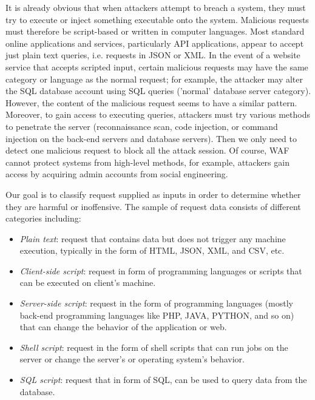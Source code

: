 It is already obvious that when attackers attempt to breach a system, they must try to execute or inject something executable onto the system. Malicious requests must therefore be script-based or written in computer languages. Most standard online applications and services, particularly API applications, appear to accept just plain text queries, i.e. requests in JSON or XML. 
In the event of a website service that accepts scripted input, certain malicious requests may have the same category or language as the normal request; for example, the attacker may alter the SQL database account using SQL queries ('normal' database server category). However, the content of the malicious request seems to have a similar pattern. Moreover, to gain access to executing queries, attackers must try various methods to penetrate the server (reconnaissance scan, code injection, or command injection on the back-end servers and database servers). Then we only need to detect one malicious request to block all the attack session. Of course, WAF cannot protect systems from high-level methods, for example, attackers gain access by acquiring admin accounts from social engineering.

Our goal is to classify request supplied as inputs in order to determine whether they are harmful or inoffensive. The sample of request data consists of different categories including:
\begin{itemize}
    \item \emph{Plain text}: request that contains data but does not trigger any machine execution, typically in the form of HTML, JSON, XML, and CSV, etc.
    \item \emph{Client-side script}: request in form of programming languages or scripts that can be executed on client's machine.
    \item \emph{Server-side script}: request in the form of programming languages (mostly back-end programming languages like PHP, JAVA, PYTHON, and so on) that can change the behavior of the application or web.
    \item \emph{Shell script}: request in the form of shell scripts that can run jobs on the server or change the server's or operating system's behavior.
    \item \emph{SQL script}: request that in form of SQL, can be used to query data from the database.
\end{itemize}

